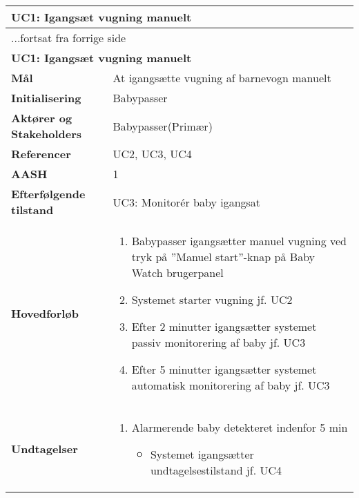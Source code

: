 \begin{center} \centering \label{kravspec:uc1}
	\begin{longtable}{|p{5cm}|p{9cm}|}  %
	\hline
		\multicolumn{2}{|l|}{\textbf{UC1: Igangsæt vugning manuelt}} \\\hline %
		\endfirsthead
		
		\multicolumn{2}{l}{...fortsat fra forrige side} \\ \hline %
		\multicolumn{2}{|l|}{\textbf{UC1: Igangsæt vugning manuelt}} \\\hline %
		\endhead	
		
		\textbf{Mål}							&At igangsætte vugning af barnevogn manuelt 		\\\hline
		\textbf{Initialisering}				&Babypasser		\\\hline
		\textbf{Aktører og Stakeholders}		&Babypasser(Primær)		\\\hline 
		\textbf{Referencer}					&UC2, UC3, UC4		\\\hline
		\textbf{AASH}						&1		\\\hline
		\textbf{Efterfølgende tilstand}		&UC3: Monitorér baby igangsat		\\\hline
		\textbf{Hovedforløb}					
			&\begin{enumerate}
	
				\item Babypasser igangsætter manuel vugning ved tryk på ''Manuel start''-knap på Baby Watch brugerpanel
				
				\item \label{kravspec:uc1_vugning}Systemet starter vugning jf. UC2
				
				\item \label{kravspec:uc1_timeout2}Efter 2 minutter igangsætter systemet passiv monitorering af baby jf. UC3			
								
				\item \label{kravspec:uc1_timeout5}Efter 5 minutter igangsætter systemet automatisk monitorering af baby jf. UC3	
				\newline [Und: \ref{kravspec:uc1_timeout5}.a Alarmerende baby detekteret indenfor 5 min]				
				
			\end{enumerate}
		\\\hline
		\textbf{Undtagelser}
			&\begin{enumerate}[label=\ref{kravspec:uc1_timeout5}.a]
			\item Alarmerende baby detekteret indenfor 5 min
					\begin{itemize}
					
					\item Systemet igangsætter undtagelsestilstand jf. UC4
					
					\end{itemize}
			\end{enumerate}
			
		\\\hline
	\end{longtable} 
\end{center}

